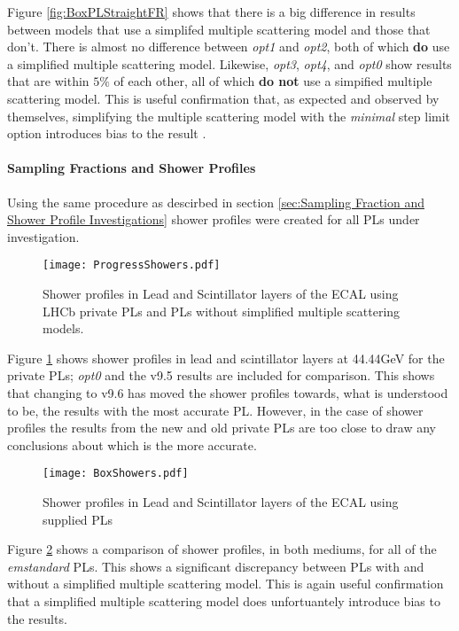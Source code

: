 Figure \ref{fig:BoxPLStraightFR} shows that there is a big difference in results between models that use a simplifed multiple scattering model and those that don't.  There is almost no difference between \textit{opt1} and \textit{opt2}, both of which \textbf{do} use a simplified multiple scattering model.  Likewise, \textit{opt3}, \textit{opt4}, and \textit{opt0} show results that are within $5\%$ of each other, all of which \textbf{do not} use a simpified multiple scattering model.  This is useful confirmation that, as expected and observed by \geant themselves, simplifying the multiple scattering model with the \textit{minimal} step limit option introduces bias to the result \cite{1742-6596-219-3-032045}.

\paragraph{Sampling Fractions and Shower Profiles} 
Using the same procedure as descirbed in section \ref{sec:Sampling Fraction and Shower Profile Investigations} shower profiles were created for all PLs under investigation.  
\begin{figure}[h]
  \centering
  \texttt{[image: ProgressShowers.pdf]}
  \caption{Shower profiles in Lead and Scintillator layers of the ECAL using LHCb private PLs and \geant PLs without simplified multiple scattering models.}
  \label{fig:LHCbPLShowers}
\end{figure}

Figure \ref{fig:LHCbPLShowers} shows shower profiles in lead and scintillator layers at 44.44GeV for the \lhcb private PLs; \textit{opt0} and the v9.5 results are included for comparison.  This shows that changing to \geant v9.6 has moved the shower profiles towards, what is understood to be, the results with the most accurate PL.  However, in the case of shower profiles the results from the new and old \lhcb private PLs are too close to draw any conclusions about which is the more accurate.

\begin{figure}[h]
  \centering
  \texttt{[image: BoxShowers.pdf]}
  \caption{Shower profiles in Lead and Scintillator layers of the ECAL using \geant supplied PLs}
  \label{fig:BoxPLShowers}
\end{figure}

Figure \ref{fig:BoxPLShowers} shows a comparison of shower profiles, in both mediums, for all of the \textit{emstandard} PLs.  This shows a significant discrepancy between PLs with and without a simplified multiple scattering model.  This is again useful confirmation that a simplified multiple scattering model does unfortuantely introduce bias to the results.


